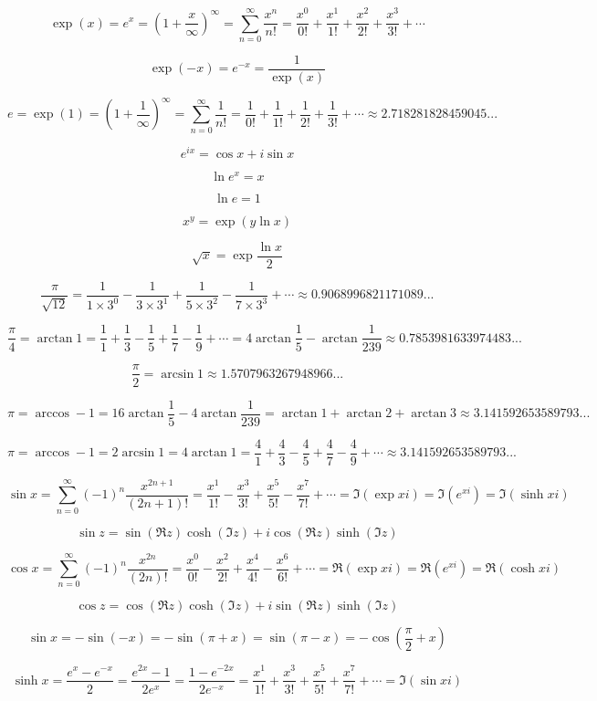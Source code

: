 \documentclass{article}
\begin{document}
$$\exp(x) = e^x = (1 + \frac{x}{\infty})^\infty =
\sum_{n=0}^\infty \frac{x^n}{n!} =
\frac{x^0}{0!} + \frac{x^1}{1!} + \frac{x^2}{2!} + \frac{x^3}{3!} + \cdots$$

$$\exp(-x) = e^{-x} = \frac{1}{\exp(x)}$$

$$e = \exp(1) = (1 + \frac{1}{\infty})^\infty = \sum_{n=0}^\infty \frac{1}{n!} =
\frac{1}{0!} + \frac{1}{1!} + \frac{1}{2!} + \frac{1}{3!} + \cdots \approx 2.718281828459045...$$

$$e^{ix} = \cos x + i\sin x$$

$$\ln e^x = x$$

$$\ln e = 1$$

$$x^y = \exp(y\ln x)$$

$$\sqrt{x} = \exp\frac{\ln x}{2}$$

$$\frac{\pi}{\sqrt{12}} =
\frac{1}{1\times3^0}-\frac{1}{3\times3^1}+\frac{1}{5\times3^2}-\frac{1}{7\times3^3}+
\cdots\approx0.9068996821171089...$$

$$\frac{\pi}{4} = \arctan1 =
\frac{1}{1} + \frac{1}{3} - \frac{1}{5} + \frac{1}{7} - \frac{1}{9} + \cdots =
4\arctan{\frac{1}{5}} - \arctan{\frac{1}{239}}\approx0.7853981633974483...$$

$$\frac{\pi}{2} = \arcsin1 \approx 1.5707963267948966...$$

$$\pi = \arccos-1 = 16\arctan{\frac{1}{5}} - 4\arctan{\frac{1}{239}} =
\arctan1 + \arctan2 + \arctan3\approx 3.141592653589793...$$

$$\pi = \arccos-1 = 2\arcsin1 = 4\arctan1 =
\frac{4}{1} + \frac{4}{3} - \frac{4}{5} + \frac{4}{7} - \frac{4}{9} + \cdots\approx
3.141592653589793...$$

$$\sin x = \sum_{n=0}^{\infty}(-1)^n\frac{x^{2n+1}}{(2n+1)!} =
\frac{x^1}{1!} - \frac{x^3}{3!} + \frac{x^5}{5!} - \frac{x^7}{7!} + \cdots =
\Im(\exp xi) = \Im(e^{xi}) = \Im(\sinh xi)$$

$$\sin z = \sin(\Re z)\cosh(\Im z) + i\cos(\Re z)\sinh(\Im z)$$

$$\cos x = \sum_{n=0}^{\infty}(-1)^n\frac{x^{2n}}{(2n)!} =
\frac{x^0}{0!} - \frac{x^2}{2!} + \frac{x^4}{4!} - \frac{x^6}{6!} + \cdots =
\Re(\exp xi) = \Re(e^{xi}) =  \Re(\cosh xi)$$

$$\cos z = \cos(\Re z)\cosh(\Im z) + i\sin(\Re z)\sinh(\Im z)$$

$$\sin x = -\sin(-x) = -\sin(\pi + x) = \sin(\pi - x) = -\cos(\frac{\pi}{2} + x)$$

$$\sinh x = \frac{e^x - e^{-x}}{2} = \frac{e^{2x} - 1}{2e^x} = \frac{1 - e^{-2x}}{2e^{-x}} =
\frac{x^1}{1!} + \frac{x^3}{3!} + \frac{x^5}{5!} + \frac{x^7}{7!} + \cdots=\Im(\sin xi)$$
\end{document}
